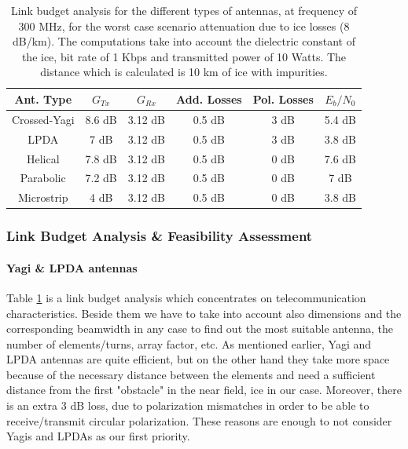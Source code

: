 \begin{table}[ht]
\centering
\begin{tabular}{| c | c | c | c | c | c |}
\hline
 \textbf{Ant. Type} & \textbf{$G_{Tx}$ } & \textbf{$G_{Rx}$ } & \textbf{Add. Losses } & \textbf{Pol. Losses} & $E_{b}/N_{0} $ \\ 
 \hline
 Crossed-Yagi & 8.6 dB & 3.12 dB & 0.5 dB & 3 dB & 5.4 dB \\
 \hline
 LPDA & 7 dB & 3.12 dB & 0.5 dB & 3 dB & 3.8 dB\\
 \hline
 Helical & 7.8 dB & 3.12 dB & 0.5 dB & 0 dB & 7.6 dB\\
 \hline
 Parabolic & 7.2 dB & 3.12 dB & 0.5 dB & 0 dB & 7 dB\\
 \hline
 Microstrip & 4 dB & 3.12 dB & 0.5 dB & 0 dB & 3.8 dB\\
 \hline
\end{tabular}
\caption{Link budget analysis for the different types of antennas, at frequency of 300 MHz, for the worst case scenario attenuation due to ice losses (8 dB/km). The computations take into account the dielectric constant of the ice, bit rate of 1 Kbps and transmitted power of 10 Watts. The distance which is calculated is 10 km of ice with impurities.}
\label{table: link_budget}
\end{table}

\subsubsection{Link Budget Analysis \& Feasibility Assessment}
\paragraph{Yagi \& LPDA antennas}
Table \ref{table: link_budget} is a link budget analysis which concentrates on telecommunication characteristics. Beside them we have to take into account also dimensions and the corresponding beamwidth in any case to find out the most suitable antenna, the number of elements/turns, array factor, etc. As mentioned earlier, Yagi and LPDA antennas are quite efficient, but on the other hand they take more space because of the necessary distance between the elements and need a sufficient distance from the first "obstacle" in the near field, ice in our case. Moreover, there is an extra 3 dB loss, due to polarization mismatches in order to be able to receive/transmit circular polarization. These reasons are enough to not consider Yagis and LPDAs as our first priority. 
